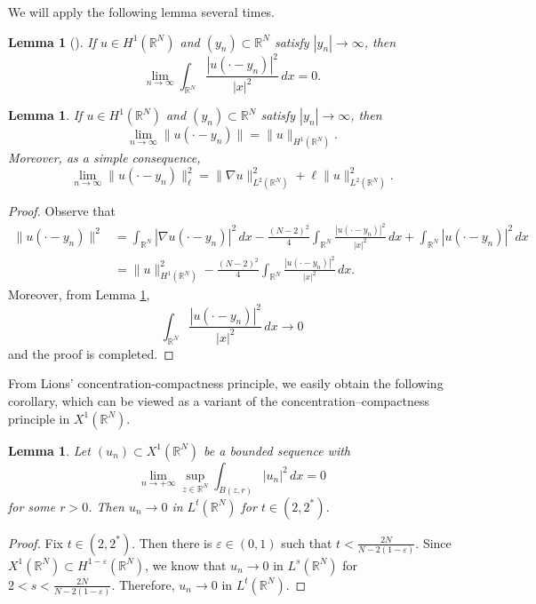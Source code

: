 \documentclass[12pt,leqno,twoside,sort]{amsart}
\newtheorem{Lem}[Th]{Lemma}
\newcommand{\R}{\mathbb{R}}
\numberwithin{equation}{section}
\begin{document}
We will apply the following lemma several times.

\begin{Lem}[{\cite[Lemma 3.1]{GuoMederski}}] \label{L:MederskiGuo}
If $u \in H^1 (\R^N)$ and $(y_n) \subset \R^N$ satisfy $|y_n|\to\infty$, then
$$
\lim_{n\to\infty} \int_{\R^N} \frac{|u(\cdot - y_n)|^2}{|x|^2} \, dx = 0.
$$
\end{Lem}



\begin{Lem} \label{H1-translations-bounded}
If $u \in H^1 (\R^N)$ and $(y_n) \subset \R^N$ satisfy $|y_n| \to \infty$, then
$$
\lim_{n\to\infty} \| u (\cdot - y_n) \| = \| u \|_{H^1 (\R^N)}.
$$
Moreover, as a simple consequence,
$$
\lim_{n\to\infty} \|u (\cdot - y_n)\|_\ell^2 = \| \nabla u\|_{L^2 (\R^N)}^2 + \ell \| u \|_{L^2 (\R^N)}^2.
$$
\end{Lem}

\begin{proof}
Observe that 
\begin{align*}
\| u (\cdot - y_n) \|^2 &= \int_{\R^N} |\nabla u(\cdot - y_n)|^2 \, dx - \frac{(N-2)^2}{4} \int_{\R^N} \frac{|u(\cdot - y_n)|^2}{|x|^2} \, dx + \int_{\R^N} |u(\cdot - y_n)|^2 \, dx \\
&= \|u\|_{H^1 (\R^N)}^2 - \frac{(N-2)^2}{4} \int_{\R^N} \frac{|u(\cdot - y_n)|^2}{|x|^2} \, dx. 
\end{align*}
Moreover, from Lemma \ref{L:MederskiGuo},
$$
\int_{\R^N} \frac{|u(\cdot - y_n)|^2}{|x|^2} \, dx \to 0
$$
and the proof is completed.
\end{proof}

From Lions’ concentration-compactness principle, we easily obtain the following corollary, which can be viewed as a variant of the concentration–compactness principle in $X^1 (\R^N)$.

\begin{Lem}\label{lionsLem}
Let $(u_n) \subset X^1 (\R^N)$ be a bounded sequence with
$$
\lim_{n \to +\infty} \sup_{z \in \R^N} \int_{B(z, r)} |u_n|^2 \, dx = 0
$$
for some $r > 0$. Then $u_n \to 0$ in $L^t (\R^N)$ for $t \in (2, 2^*)$.
\end{Lem}

\begin{proof}
Fix $t \in (2, 2^*)$. Then there is $\varepsilon \in (0,1)$ such that $t < \frac{2N}{N-2(1-\varepsilon)}$. Since $X^1 (\R^N) \subset H^{1-\varepsilon} (\R^N)$, we know that $u_n \to 0$ in $L^s (\R^N)$ for $2 < s < \frac{2N}{N-2(1-\varepsilon)}$. Therefore, $u_n \to 0$ in $L^t (\R^N)$.
\end{proof}
\end{document}
